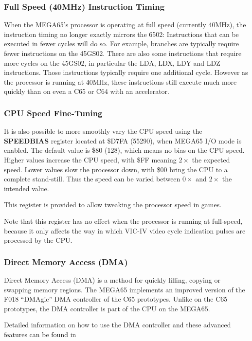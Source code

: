\subsubsection{Full Speed (40MHz) Instruction Timing}

When the MEGA65's processor is operating at full speed
(currently 40MHz), the instruction
timing no longer exactly mirrors the 6502: Instructions that can be
executed in fewer cycles
will do so. For example, branches are typically require fewer instructions on the 45GS02.
There are also some instructions that require more cycles on the 45GS02, in particular the
LDA, LDX, LDY and LDZ instructions. Those instructions typically require one additional cycle.
However as the processor is running at 40MHz, these instructions still execute much more quickly
than on even a C65 or C64 with an accelerator.

\subsubsection{CPU Speed Fine-Tuning}
It is also possible to more smoothly
vary the CPU speed using the {\bf SPEEDBIAS} register located at \$D7FA (55290), when MEGA65 I/O mode
is enabled.  The default value is \$80 (128), which means no bias on the CPU speed.  Higher values
increase the CPU speed, with \$FF meaning $2\times$ the expected speed. Lower values slow
the processor down, with \$00 bring the CPU to a complete stand-still.  Thus the speed can be
varied between $0\times$ and $2\times$ the intended value.

This register is provided to allow tweaking the processor speed in games.

Note that this register has no effect when
the processor is running at full-speed, because it only affects the way in which VIC-IV
video cycle indication pulses are processed by the CPU.

\subsubsection{Direct Memory Access (DMA)}
Direct Memory Access (DMA) is a method for quickly filling, copying or swapping memory regions.
The MEGA65 implements an improved version of the F018 ``DMAgic'' DMA controller of the C65 prototypes.
 Unlike on the C65 prototypes, the DMA controller is part of the CPU on the MEGA65.

Detailed information on how to use the DMA controller and these advanced features can be found in 

